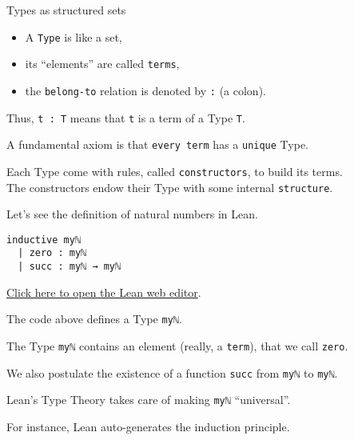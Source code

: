 \documentclass{beamer}
\begin{document}
\begin{frame}[fragile]{Types as structured sets}

\vspace{10pt}
\vspace{-13pt}
\begin{itemize}
\setlength\itemsep{-12pt}
\item
  A {\color{violet}\verb`Type`} is like a set,
\item
  its ``elements'' are called {\color{violet}\verb`terms`},
\item
  the {\color{violet}\verb`belong-to`} relation is denoted by {\color{violet}\verb`:`} (a colon).
\end{itemize}

Thus, {\color{violet}\verb`t : T`} means that {\color{violet}\verb`t`} is a term of a Type {\color{violet}\verb`T`}.

A fundamental axiom is that {\color{violet}\verb`every term`} has a {\color{violet}\verb`unique`} Type.

Each Type come with rules, called {\color{violet}\verb`constructors`}, to build its terms.
\\
The constructors endow their Type with some internal {\color{violet}\verb`structure`}.

Let's see the definition of natural numbers in Lean.
\end{frame}

\begin{frame}[fragile]

\begin{verbatim}
inductive myℕ
  | zero : myℕ
  | succ : myℕ → myℕ
\end{verbatim}
\vspace{-20pt}
{\small{\href{https://leanprover-community.github.io/lean-web-editor/#code=inductive%20my%E2%84%95%0A%20%20%7C%20zero%20%3A%20my%E2%84%95%0A%20%20%7C%20succ%20%3A%20my%E2%84%95%20%E2%86%92%20my%E2%84%95%0A%0A%23print%20prefix%20my%E2%84%95%0A}{Click here to open the Lean web editor}.}}
\bigskip

The code above defines a Type {\color{violet}\verb`myℕ`}.
\bigskip

The Type {\color{violet}\verb`myℕ`} contains an element (really, a {\color{violet}\verb`term`}), that we call {\color{violet}\verb`zero`}.
\bigskip

We also postulate the existence of a function {\color{violet}\verb`succ`} from {\color{violet}\verb`myℕ`} to {\color{violet}\verb`myℕ`}.
\bigskip

Lean's Type Theory takes care of making {\color{violet}\verb`myℕ`} ``universal''.
\bigskip

For instance, Lean auto-generates the induction principle.
\end{frame}
\end{document}
